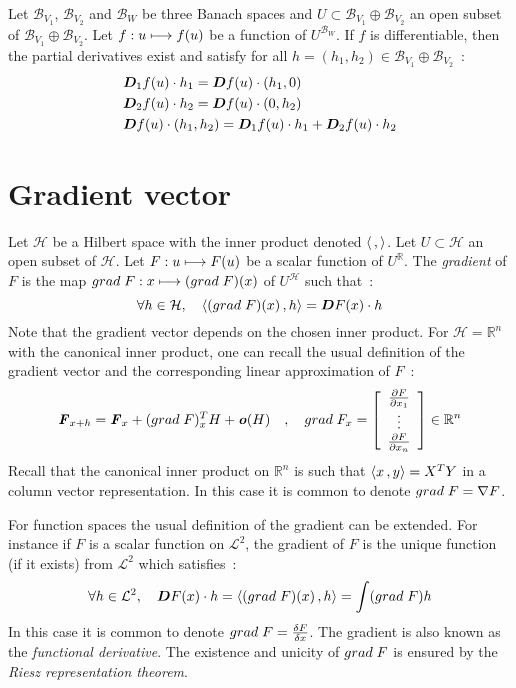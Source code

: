 Let $\mathcal{B}_{V_1}$, $\mathcal{B}_{V_2}$ and $\mathcal{B}_W$ be three Banach spaces and $U \subset \mathcal{B}_{V_1}\oplus\mathcal{B}_{V_2}$ an open subset of $\mathcal{B}_{V_1}\oplus\mathcal{B}_{V_2}$.
Let $f : u \longmapsto f(u)$ be a function of  $U^{\mathcal{B}_W}$.
If $f$ is differentiable, then the partial derivatives exist and satisfy for all $h = (h_1,h_2) \in \mathcal{B}_{V_1}\oplus\mathcal{B}_{V_2}$~:
\begin{align}
	&\boldsymbol{D}_1f(u)\cdot h_1 = \boldsymbol{D}f(u)\cdot(h_1,0) \\
	&\boldsymbol{D}_2f(u)\cdot h_2 = \boldsymbol{D}f(u)\cdot(0,h_2) \\
	&\boldsymbol{D}f(u)\cdot(h_1,h_2) = \boldsymbol{D}_1f(u)\cdot h_1 + \boldsymbol{D}_2f(u)\cdot h_2
\end{align}

\section{Gradient vector}

Let $\mathcal{H}$ be a Hilbert space with the inner product denoted $\langle \,, \rangle$. Let $U \subset \mathcal{H}$ an open subset of $\mathcal{H}$.
Let $F : u \longmapsto F(u)$ be a scalar function of  $U^{\mathbb{R}}$.
The \emph{gradient} of $F$ is the map $grad\;F : x \longmapsto (grad\;F)(x)$ of $U^{\mathcal{H}}$ such that~:
\begin{equation}
	\forall h \in \mathcal{H}, \quad  \langle (grad\;F)(x)\,, h\rangle = \boldsymbol{D}F(x)\cdot h
\end{equation}
Note that the gradient vector depends on the chosen inner product.
For $\mathcal{H} = \mathbb{R}^{n}$ with the canonical inner product, one can recall the usual definition of the gradient vector and the corresponding linear approximation of $F$~:
\begin{equation}
	\boldsymbol{\mathit{F}}_{x+h} = \boldsymbol{\mathit{F}}_{x} + (grad\;F)_{x}^T H + \boldsymbol{\mathit{o}}(H)
	\quad , \quad grad\;F_{x} = \left[\begin{array}{c}\frac{\partial F}{\partial x_1} \\ \vdots \\ \frac{\partial F}{\partial x_n}\end{array}\right] \in \mathbb{R}^n
\end{equation}
Recall that the canonical inner product on $\mathbb{R}^{n}$ is such that $\langle x\,, y\rangle = X^{T}Y$ in a column vector representation. In this case it is common to denote $grad\;F = \nabla{F}$.

For function spaces the usual definition of the gradient can be extended. For instance if $F$ is a scalar function on $\mathcal{L}^2$, the gradient of $F$ is the unique function (if it exists) from $\mathcal{L}^2$ which satisfies~:
\begin{equation}
	\forall h \in \mathcal{L}^2, \quad \boldsymbol{D}F(x)\cdot h = \langle (grad\;F)(x)\,, h\rangle = \int (grad\;F)h
\end{equation}
In this case it is common to denote $grad\;F = \frac{\delta F}{\delta x}$. The gradient is also known as the \emph{functional derivative}. The existence and unicity of $grad\;F$ is ensured by the \emph{Riesz representation theorem}.


